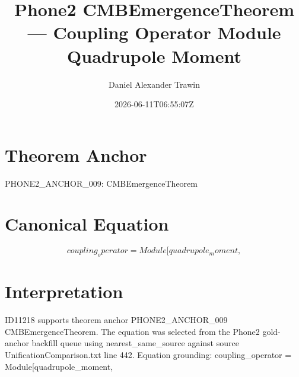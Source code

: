 \documentclass[11pt]{article}
\title{Phone2 CMBEmergenceTheorem — Coupling Operator Module Quadrupole Moment}
\author{Daniel Alexander Trawin}
\date{2026-06-11T06:55:07Z}
\begin{document}
\maketitle
\section*{Theorem Anchor}
PHONE2_ANCHOR_009: CMBEmergenceTheorem
\section*{Canonical Equation}
\[
coupling_operator = Module[{quadrupole_moment},
\]
\section*{Interpretation}
ID11218 supports theorem anchor PHONE2_ANCHOR_009 CMBEmergenceTheorem. The equation was selected from the Phone2 gold-anchor backfill queue using nearest_same_source against source UnificationComparison.txt line 442. Equation grounding: coupling_operator = Module[{quadrupole_moment},
\end{document}
